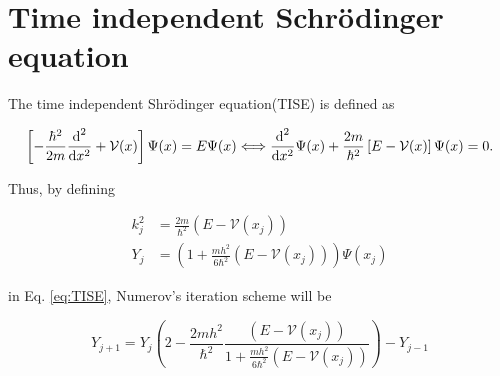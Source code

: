 \section{Time independent Schrödinger equation}

The time independent Shrödinger equation(TISE) is defined as

\begin{equation}
  \label{eq:TISE}
  \left[ -\frac{\hbar^2}{2m} \frac{\textnormal{d}^2}{\textnormal{d} x^2} + \mathcal V(x) \right]\Psi(x) = E\Psi(x) \Longleftrightarrow \frac{\textnormal{d}^2}{\textnormal{d} x^2}\Psi(x) + \frac{2m}{\hbar^2}\left[E - \mathcal V(x) \right] \Psi(x) = 0.
\end{equation}

Thus, by defining

\begin{subequations}
  \begin{align}
    k_{j}^2 &= \frac{2m}{\hbar^2}(E-\mathcal V(x_j)) \\
    Y_j &= \left(1 + \frac{m h^2}{6 \hbar^2}(E-\mathcal V(x_j))\right) \Psi(x_j)
  \end{align}
\end{subequations}

in Eq. \eqref{eq:TISE}, Numerov's iteration scheme will be

\begin{equation}
  \label{eq:numerovTISE}
  Y_{j+1} = Y_j \left( 2 - \frac{2m h^2}{\hbar^2} \frac{(E-\mathcal V(x_j))}{1+ \frac{mh^2}{6\hbar^2}(E-\mathcal V(x_j))} \right) - Y_{j-1}
\end{equation}
